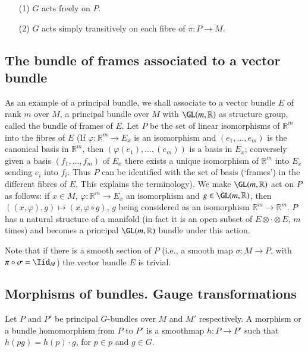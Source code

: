 \begin{remarks*}
\begin{itemize}
\item[(1)] $G$ acts freely on $P$.

\item[(2)] $G$ acts simply transitively on each fibre of $\pi:P\to M$.
\end{itemize}
\end{remarks*}

\subsection*{The bundle of frames associated to a vector bundle}

As an example of a principal bundle, we shall associate to a vector bundle $E$ of rank $m$ over $M$, a principal bundle over $M$ with $\GL(m,\mathbb{R})$ as structure group, called the bundle of frames of $E$. Let $P$ be the set of linear isomorphisms of $\mathbb{R}^{m}$ into the fibres of $E$ (If $\varphi:\mathbb{R}^{m}\to E_{x}$ is an isomorphism and $(e_{1},\ldots,e_{m})$ is the canonical basis in $\mathbb{R}^{m}$, then $(\varphi(e_{1}),\ldots,(e_{m}))$ is a basis in $E_{x}$; conversely given a basis $(f_{1},\ldots,f_{m})$ of $E_{x}$ there exists a unique isomorphism of $\mathbb{R}^{m}$ into $E_{x}$ sending $e_{i}$ into $f_{i}$. Thus $P$ can be identified with the set of basis (`frames') in the different fibres of $E$. This explains the terminology). We make $\GL(m,\mathbb{R})$ act on $P$ as follows: if $x\in M$, $\varphi:\mathbb{R}^{m}\to E_{x}$ an isomorphism and $g\in \GL(m,\mathbb{R})$, then $((x,\varphi),g)\mapsto (x,\varphi\circ g)$, $g$ being considered as an isomorphism $\mathbb{R}^{m}\to \mathbb{R}^{m}$. $P$ has a natural structure of a manifold (in fact it is an open subset of $E\otimes\cdot\otimes E$, $m$ times) and becomes a principal $\GL(m,\mathbb{R})$ bundle under this action.

Note that if there is a smooth section of $P$ (i.e., a smooth map $\sigma:M\to P$, with $\pi\circ \sigma=\Iid_{M}$) the vector bundle $E$ is trivial.

\subsection*{Morphisms of bundles. Gauge transformations}

Let $P$ and $P'$ be principal $G$-bundles over $M$ and $M'$ respectively. A morphism or a bundle homomorphism from $P$ to $P'$ is a smooth\pageoriginale map $h:P\to P'$ such that $h(pg)=h(p)\cdot g$, for $p\in p$ and $g\in G$.

